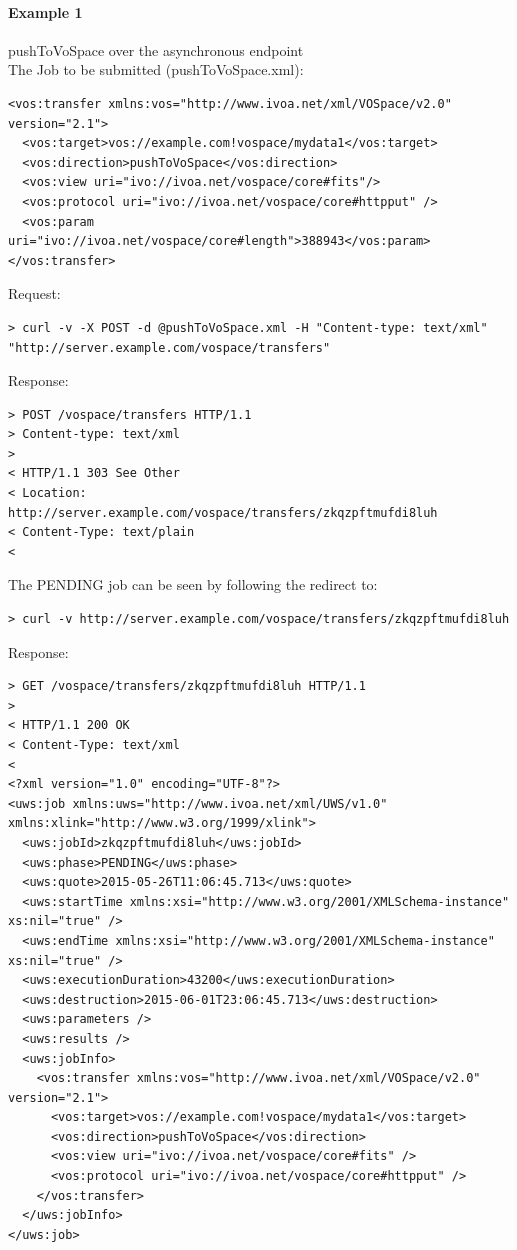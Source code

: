 \documentclass[11pt,a4paper]{ivoa}
\begin{document}
\paragraph{Example 1}
pushToVoSpace over the asynchronous endpoint
\\[5px]
\noindent
The Job to be submitted (pushToVoSpace.xml):
\begin{lstlisting}
<vos:transfer xmlns:vos="http://www.ivoa.net/xml/VOSpace/v2.0" version="2.1">
  <vos:target>vos://example.com!vospace/mydata1</vos:target>
  <vos:direction>pushToVoSpace</vos:direction>
  <vos:view uri="ivo://ivoa.net/vospace/core#fits"/>
  <vos:protocol uri="ivo://ivoa.net/vospace/core#httpput" />
  <vos:param uri="ivo://ivoa.net/vospace/core#length">388943</vos:param>
</vos:transfer>
\end{lstlisting}
Request:
\begin{lstlisting}
> curl -v -X POST -d @pushToVoSpace.xml -H "Content-type: text/xml" "http://server.example.com/vospace/transfers"
\end{lstlisting}
Response:
\begin{lstlisting}
> POST /vospace/transfers HTTP/1.1
> Content-type: text/xml
>
< HTTP/1.1 303 See Other
< Location: http://server.example.com/vospace/transfers/zkqzpftmufdi8luh
< Content-Type: text/plain
<
\end{lstlisting}
The PENDING job can be seen by following the redirect to:
\begin{lstlisting}
> curl -v http://server.example.com/vospace/transfers/zkqzpftmufdi8luh
\end{lstlisting}
Response:
\begin{lstlisting}
> GET /vospace/transfers/zkqzpftmufdi8luh HTTP/1.1
>
< HTTP/1.1 200 OK
< Content-Type: text/xml
<
<?xml version="1.0" encoding="UTF-8"?>
<uws:job xmlns:uws="http://www.ivoa.net/xml/UWS/v1.0" xmlns:xlink="http://www.w3.org/1999/xlink">
  <uws:jobId>zkqzpftmufdi8luh</uws:jobId>
  <uws:phase>PENDING</uws:phase>
  <uws:quote>2015-05-26T11:06:45.713</uws:quote>
  <uws:startTime xmlns:xsi="http://www.w3.org/2001/XMLSchema-instance" xs:nil="true" />
  <uws:endTime xmlns:xsi="http://www.w3.org/2001/XMLSchema-instance" xs:nil="true" />
  <uws:executionDuration>43200</uws:executionDuration>
  <uws:destruction>2015-06-01T23:06:45.713</uws:destruction>
  <uws:parameters />
  <uws:results />
  <uws:jobInfo>
    <vos:transfer xmlns:vos="http://www.ivoa.net/xml/VOSpace/v2.0" version="2.1">
      <vos:target>vos://example.com!vospace/mydata1</vos:target>
      <vos:direction>pushToVoSpace</vos:direction>
      <vos:view uri="ivo://ivoa.net/vospace/core#fits" />
      <vos:protocol uri="ivo://ivoa.net/vospace/core#httpput" />
    </vos:transfer>
  </uws:jobInfo>
</uws:job>
\end{lstlisting}
\end{document}
